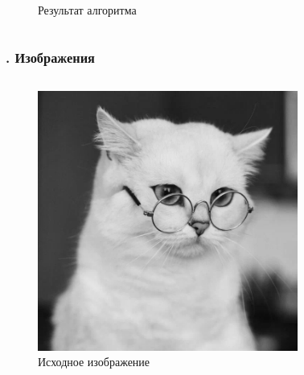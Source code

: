 \documentclass[t aspectratio=169]{beamer}
\begin{document}
\begin{frame}
\begin{columns}
\begin{figure}
\begin{center}
          \caption{Результат алгоритма}
        \end{center}
      \end{figure}
    \normalsize
    \end{columns}
  \end{frame}

  \begin{frame}\frametitle{\insertsection . Изображения}
    \begin{columns}
      \large
      \begin{figure}
        \begin{center}
          \includegraphics[width=1\textwidth]{./images/cat.png}
          \caption{Исходное изображение}
        \end{center}
      \end{figure}
      \begin{figure}
        \begin{center}

\end{center}
\end{figure}
\end{columns}
\end{frame}
\end{document}
